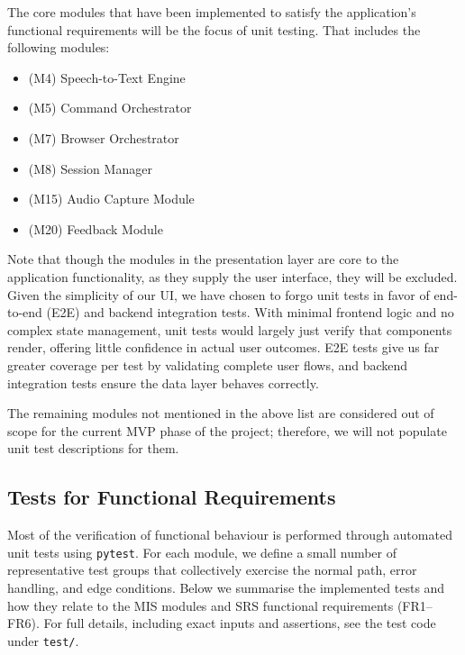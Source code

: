 \documentclass[12pt, titlepage]{article}
\begin{document}
The core modules that have been implemented to satisfy the application's functional requirements will be the focus of unit testing. That includes the following modules:
\begin{itemize}
    \item (M4) Speech-to-Text Engine
    \item (M5) Command Orchestrator
    \item (M7) Browser Orchestrator
    \item (M8) Session Manager
    \item (M15) Audio Capture Module
    \item (M20) Feedback Module
\end{itemize}

Note that though the modules in the presentation layer are core to the application functionality, as they supply the user interface, they will be excluded. Given the simplicity of our UI, we have chosen to forgo unit tests in favor of end-to-end (E2E) and backend integration tests. With minimal frontend logic and no complex state management, unit tests would largely just verify that components render, offering little confidence in actual user outcomes. E2E tests give us far greater coverage per test by validating complete user flows, and backend integration tests ensure the data layer behaves correctly.

The remaining modules not mentioned in the above list are considered out of scope for the current MVP phase of the project; therefore, we will not populate unit test descriptions for them. 
\subsection{Tests for Functional Requirements}

Most of the verification of functional behaviour is performed through automated unit tests using \texttt{pytest}. For each module, we define a small number of representative test groups that collectively exercise the normal path, error handling, and edge conditions. Below we summarise the implemented tests and how they relate to the MIS modules and SRS functional requirements (FR1--FR6). For full details, including exact inputs and assertions, see the test code under \texttt{test/}.

\end{document}
